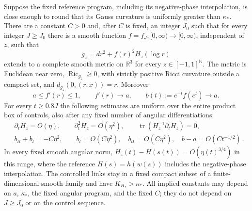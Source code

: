\begin{proposition}
\label{n:prop-radial-realization}
Suppose the fixed reference program, including its negative-phase
interpolation, is close enough to round that its Gauss curvature is
uniformly greater than $\kappa_*$. There are a constant
$C>0$ and, after $C$ is fixed, an integer $J_0$ such that for every integer
$J\geq J_0$ there is a smooth function
$f=f_J:[0,\infty)\to[0,\infty)$, independent of $z$, such that
\[
 g_z=dr^2+f(r)^2H_z(\log r)
\]
extends to a complete smooth metric on $\mathbb R^3$ for every
$z\in[-1,1]^{\mathbb N}$. The metric is Euclidean near zero,
$\operatorname{Ric}_{g_z}\geq0$, with strictly positive Ricci curvature
outside a compact set, and $d_{g_z}(0,(r,x))=r$. Moreover
\[
 a\leq f'(r)\leq1,\qquad f'(r)\to a,\qquad b(t):=e^{-t}f(e^t)\to a.
\]
For every $t\geq0.8J$ the following estimates are uniform over the entire
product box of controls, also after any fixed number of angular
differentiations:
\begin{align}
 &\partial_tH_z=O(\eta),\qquad \partial_t^2H_z=O(\eta^2),
   \qquad \operatorname{tr}(H_z^{-1}\partial_tH_z)=0,
   \label{n:angular-time-input}\\
 &b_{tt}+b_t=-C\eta^2,\qquad
   b_t=O(C\eta^2),\quad b_{tt}=O(C\eta^2),\quad
   b-a=O(Ct^{-1/2}). \label{n:radial-tail-input}
\end{align}
In every fixed smooth angular norm,
$H_z(t)-H(s(t))=O(\eta(t)^{3/4})$ in this range, where the reference
$H(s)=h(w(s))$ includes the negative-phase interpolation.
The controlled links stay in a fixed compact subset of a finite-dimensional
smooth family and have $K_{H_z}>\kappa_*$. All implied constants may depend
on $a$, $\kappa_*$, the fixed angular program, and the fixed $C$; they do not depend on
$J\geq J_0$ or on the control sequence.
\end{proposition}

